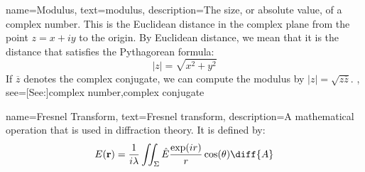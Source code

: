 {
    name={Modulus},
    text={modulus},
    description={The size, or absolute value, of a complex number. This
                 is the Euclidean distance in the complex plane from the
                 point $z=x+iy$ to the origin. By Euclidean distance,
                 we mean that it is the distance that satisfies the
                 Pythagorean formula:
                 \begin{equation*}
                     |z|=\sqrt{x^{2}+y^{2}}
                 \end{equation*}
                 If $\overline{z}$ denotes the complex conjugate,
                 we can compute the modulus by
                 $|z|=\sqrt{z\overline{z}}$.
                },
    see=[See:]{complex number,complex conjugate}
}

{
    name={Fresnel Transform},
    text={Fresnel transform},
    description={A mathematical operation that is used in
                 diffraction theory. It is defined by:
                 \begin{equation*}
                     E(\mathbf{r})=\frac{1}{i\lambda}
                     \iint_{\Sigma}\hat{E}\frac{\exp(ir)}{r}
                     \cos(\theta)\diff{A}
                 \end{equation*}
                }
}
